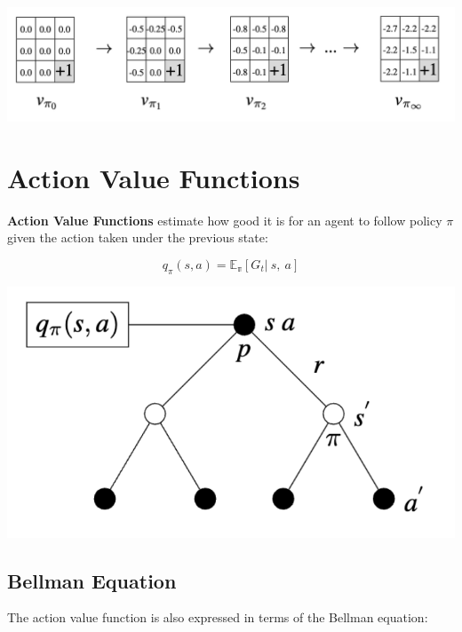 \documentclass[
  letterpaper,
  DIV=11,
  numbers=noendperiod]{scrreprt}
\begin{document}
\begin{tcolorbox}[enhanced jigsaw, toprule=.15mm, leftrule=.75mm, coltitle=black, left=2mm, opacityback=0, titlerule=0mm, arc=.35mm, toptitle=1mm, opacitybacktitle=0.6, bottomtitle=1mm, colframe=quarto-callout-tip-color-frame, title=\textcolor{quarto-callout-tip-color}{\faLightbulb}\hspace{0.5em}{Solution}, rightrule=.15mm, bottomrule=.15mm, colbacktitle=quarto-callout-tip-color!10!white, breakable, colback=white]

\begin{center}
\includegraphics[width=0.75\linewidth,height=\textheight,keepaspectratio]{lecture4/images/GridWorldSolution.png}
\end{center}

\end{tcolorbox}

\section{Action Value Functions}\label{action-value-functions}

\textbf{Action Value Functions} estimate how good it is for an agent to
follow policy \(\pi\) given the action taken under the previous state:

\[
q_{\pi}(s, a) = \mathbb{E_{\pi}}[G_{t}| \ s, \ a]
\]

\begin{center}
\includegraphics[width=0.35\linewidth,height=\textheight,keepaspectratio]{lecture4/images/ActionValue.png}
\end{center}

\subsection{Bellman Equation}\label{bellman-equation-1}

The action value function is also expressed in terms of the Bellman
equation:
\end{document}
